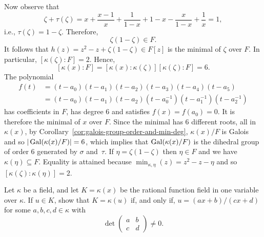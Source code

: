 \begin{solution}
    Now observe that
    $$
        \zeta + \tau(\zeta) = x + \frac{x-1}x + \frac1{1-x}
                + 1 - x - \frac x{1-x} + \frac1x
            = 1,
    $$
    i.e., $\tau(\zeta)=1-\zeta$. Therefore,
    $$
        \zeta(1-\zeta)\in F.
    $$
    It follows that $h(z)=z^2-z+\zeta(1-\zeta)\in F[z]$ is the minimal of $\zeta$ over $F$. In particular, $[\kappa(\zeta):F]=2$. Hence, 
    $$
        [\kappa(x):F]=[\kappa(x):\kappa(\zeta)][\kappa(\zeta):F]=6.
    $$
    The polynomial
    \begin{align*}
        f(t) &= (t-a_0)(t-a_1)(t-a_2)(t-a_3)(t-a_4)(t-a_5)\\
            &= (t-a_0)(t-a_1)(t-a_2)(t-a_0^{-1})(t-a_1^{-1})(t-a_2^{-1})
    \end{align*}
    has coefficients in $F$, has degree $6$ and satisfies $f(x)=f(a_0)=0$. It is therefore the minimal of $x$ over $F$. Since the minimal has $6$ different roots, all in $\kappa(x)$, by Corollary~\ref{cor:galois-group-order-and-min-deg}, $\kappa(x)/F$ is Galois and so $|\operatorname{Gal}(\kappa(x)/F)|=6$, which implies that $\operatorname{Gal}(\kappa(x)/F)$ is the dihedral group of order $6$ generated by $\sigma$ and~$\tau$. If $\eta = \zeta(1-\zeta)$ then $\eta\in F$ and we have $\kappa(\eta)\subseteq F$. Equality is attained because $\min_{\kappa,\eta}(z)=z^2-z-\eta$ and so $[\kappa(\zeta):\kappa(\eta)]=2$.
\end{solution}

\begin{probl}
    Let $\kappa$ be a field, and let\/ $K = \kappa(x)$ be the rational function field in one variable over\/ $\kappa$. If\/ $u\in K$, show that\/ $K = \kappa(u)$ if, and only if,\/ $u = (ax + b)/(cx + d)$ for some\/ $a, b, c, d\in \kappa$ with
    \begin{equation}\label{eq:rational-det}
        \det \begin{pmatrix}
            a   &b\\
            c   &d
        \end{pmatrix}\ne0.
    \end{equation}
\end{probl}

